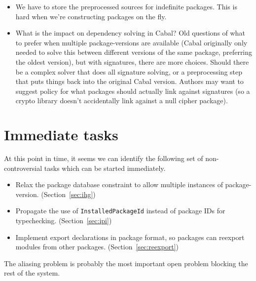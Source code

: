 \documentclass{article}
\begin{document}
\begin{itemize}
  \item We have to store the preprocessed sources for indefinite packages.
      This is hard when we're constructing packages on the fly.

  \item What is the impact on dependency solving in Cabal?  Old questions
      of what to prefer when multiple package-versions are available
      (Cabal originally only needed to solve this between different
      versions of the same package, preferring the oldest version), but
      with signatures, there are more choices.  Should there be a
      complex solver that does all signature solving, or a preprocessing
      step that puts things back into the original Cabal version.
      Authors may want to suggest policy for what packages should actually
      link against signatures (so a crypto library doesn't accidentally
      link against a null cipher package).
      \end{itemize}

\section{Immediate tasks}

At this point in time, it seems we can identify the following set
of non-controversial tasks which can be started immediately.

\begin{itemize}
    \item Relax the package database constraint to allow multiple
        instances of package-version. (Section~\ref{sec:ihg})
    \item Propagate the use of \verb|InstalledPackageId| instead of
        package IDs for typechecking. (Section~\ref{sec:ipi})
    \item Implement export declarations in package format, so
        packages can reexport modules from other packages. (Section~\ref{sec:reexport})
\end{itemize}

The aliasing problem is probably the most important open problem
blocking the rest of the system.



\end{document}
